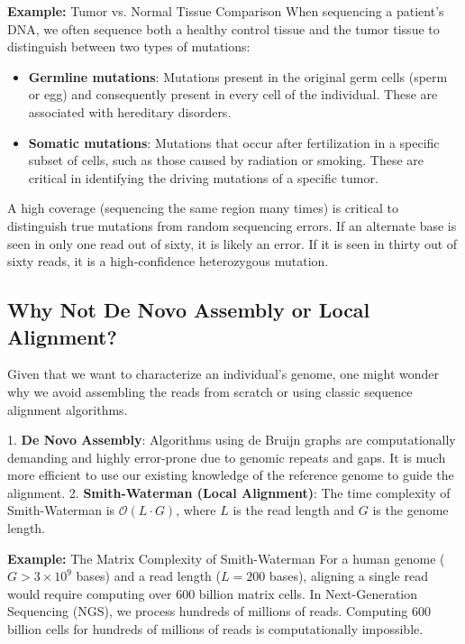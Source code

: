 \textbf{Example:} Tumor vs. Normal Tissue Comparison
When sequencing a patient's DNA, we often sequence both a healthy control tissue and the tumor tissue to distinguish between two types of mutations:
\begin{itemize}
    \item \textbf{Germline mutations}: Mutations present in the original germ cells (sperm or egg) and consequently present in every cell of the individual. These are associated with hereditary disorders.
    \item \textbf{Somatic mutations}: Mutations that occur after fertilization in a specific subset of cells, such as those caused by radiation or smoking. These are critical in identifying the driving mutations of a specific tumor.
\end{itemize}


A high coverage (sequencing the same region many times) is critical to distinguish true mutations from random sequencing errors. If an alternate base is seen in only one read out of sixty, it is likely an error. If it is seen in thirty out of sixty reads, it is a high-confidence heterozygous mutation.

\subsection{Why Not De Novo Assembly or Local Alignment?}

Given that we want to characterize an individual's genome, one might wonder why we avoid assembling the reads from scratch or using classic sequence alignment algorithms.

1. \textbf{De Novo Assembly}: Algorithms using de Bruijn graphs are computationally demanding and highly error-prone due to genomic repeats and gaps. It is much more efficient to use our existing knowledge of the reference genome to guide the alignment.
2. \textbf{Smith-Waterman (Local Alignment)}: The time complexity of Smith-Waterman is $\mathcal{O}(L \cdot G)$, where $L$ is the read length and $G$ is the genome length. 

\textbf{Example:} The Matrix Complexity of Smith-Waterman
For a human genome ($G > 3 \times 10^9$ bases) and a read length ($L = 200$ bases), aligning a single read would require computing over 600 billion matrix cells. In Next-Generation Sequencing (NGS), we process hundreds of millions of reads. Computing 600 billion cells for hundreds of millions of reads is computationally impossible.

